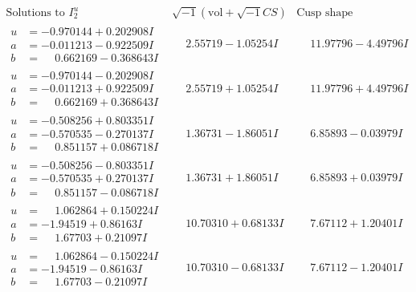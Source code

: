 \documentclass[1p]{elsarticle_modified}
\theoremstyle{definition}
\newcommand{\I}{\sqrt{-1}}
\begin{document}
$$\begin{array}{c|c|c}  
\text{Solutions to }I^u_{2}& \I (\text{vol} + \sqrt{-1}CS) & \text{Cusp shape}\\
 \hline 
\begin{aligned}
u &= -0.970144 + 0.202908 I \\
a &= -0.011213 - 0.922509 I \\
b &= \phantom{-}0.662169 - 0.368643 I\end{aligned}
 & \phantom{-}2.55719 - 1.05254 I & \phantom{-}11.97796 - 4.49796 I \\ \hline\begin{aligned}
u &= -0.970144 - 0.202908 I \\
a &= -0.011213 + 0.922509 I \\
b &= \phantom{-}0.662169 + 0.368643 I\end{aligned}
 & \phantom{-}2.55719 + 1.05254 I & \phantom{-}11.97796 + 4.49796 I \\ \hline\begin{aligned}
u &= -0.508256 + 0.803351 I \\
a &= -0.570535 - 0.270137 I \\
b &= \phantom{-}0.851157 + 0.086718 I\end{aligned}
 & \phantom{-}1.36731 - 1.86051 I & \phantom{-}6.85893 - 0.03979 I \\ \hline\begin{aligned}
u &= -0.508256 - 0.803351 I \\
a &= -0.570535 + 0.270137 I \\
b &= \phantom{-}0.851157 - 0.086718 I\end{aligned}
 & \phantom{-}1.36731 + 1.86051 I & \phantom{-}6.85893 + 0.03979 I \\ \hline\begin{aligned}
u &= \phantom{-}1.062864 + 0.150224 I \\
a &= -1.94519 + 0.86163 I \\
b &= \phantom{-}1.67703 + 0.21097 I\end{aligned}
 & \phantom{-}10.70310 + 0.68133 I & \phantom{-}7.67112 + 1.20401 I \\ \hline\begin{aligned}
u &= \phantom{-}1.062864 - 0.150224 I \\
a &= -1.94519 - 0.86163 I \\
b &= \phantom{-}1.67703 - 0.21097 I\end{aligned}
 & \phantom{-}10.70310 - 0.68133 I & \phantom{-}7.67112 - 1.20401 I \\ \hline\begin{aligned}

\end{aligned}
\end{array}$$
\end{document}
